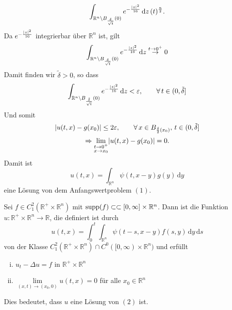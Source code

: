 \begin{beweis}
\[		\int_{\mathbb{R}^n \setminus B_{\frac{\delta }{\sqrt{t}}}(0)}^{} e^{- \frac{\lvert z\rvert^2}{16}} \,\mathrm{d}z \, (t)^{\frac{n}{2}}.
	\]
	Da $e^{- \frac{\lvert z\rvert^2}{16}}$ integrierbar über $\mathbb{R}^n$ ist, gilt 
	\[
		\int_{\mathbb{R}^n \setminus B_{\frac{\delta }{\sqrt{t}}}(0)}^{} e^{- \frac{\lvert z\rvert^2}{16}} \,\mathrm{d}z \stackrel{t \to 0^+}{\to } 0
	\]
	Damit finden wir $\tilde \delta >0$, so dass 
	\[
		\int_{\mathbb{R}^n \setminus B_{\frac{\tilde \delta }{\sqrt{t}}}(0)}^{} e^{- \frac{\lvert z\rvert^2}{16}} \,\mathrm{d}z < \varepsilon,
		 \qquad \forall\, t \in (0,\tilde \delta ]
	\]
	Und somit
	\[
		\lvert u(t,x)-g(x_0)\rvert \leq 2 \varepsilon, \qquad \forall\, x \in B_{\frac{\delta }{2}(x_0)}, \,t \in (0, \tilde \delta]
	\]
	\[
		\Rightarrow \lim_{\substack{t \to 0^+ \\ x \to x_0}} \lvert u(t,x)-g(x_0)\rvert = 0.
	\]
	Damit ist
	\[
		u(t,x)= \int_{\mathbb{R}^n}^{} \psi(t,x-y)g(y) \,\mathrm{d}y
	\]
	eine Lösung von dem Anfangswertproblem $(1)$.
\end{beweis}
\begin{satz}
	Sei $f \in C_1^2(\mathbb{R}^{+} \times \mathbb{R}^n)$ mit $\operatorname{supp}(f) \subset \subset [0,\infty] \times \mathbb{R}^n$. Dann ist die Funktion $u : \mathbb{R}^{+} \times \mathbb{R}^n \to \mathbb{R}$, die definiert ist durch
	\[
		u(t,x)= \int_{0}^{t} \int_{\mathbb{R}^n}^{} \psi(t-s,x-y)f(s,y) \,\mathrm{d}y \,\mathrm{d}s
	\]
	von der Klasse $C_1^2(\mathbb{R}^{+} \times \mathbb{R}^n) \cap C^0([0,\infty)\times \mathbb{R}^n)$ und erfüllt
	\begin{enumerate}[(i)]
		\item $u_t- \Delta u =f$ in $\mathbb{R}^{+} \times \mathbb{R}^n$
		\item $\lim\limits_{(x,t) \to (x_0,0)} u(t,x) =0$ für alle $x_0 \in \mathbb{R}^n$
	\end{enumerate}
	Dies bedeutet, dass $u$ eine Lösung von $(2)$ ist.
\end{satz}
